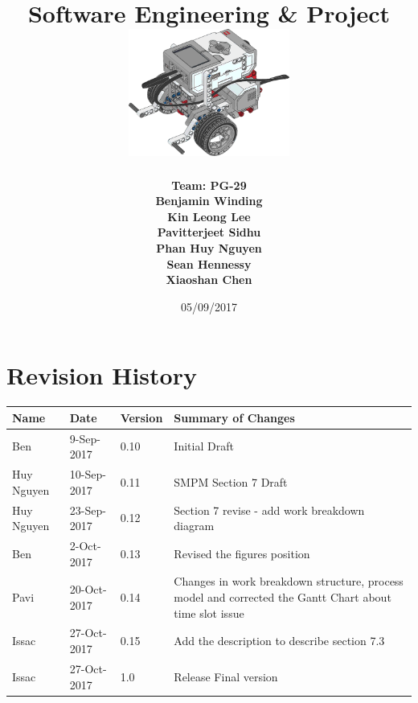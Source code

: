 \documentclass[10pt,a4paper,titlepage]{article}
\begin{document}
	
	\begin{titlepage}
		
		\title{
			\fontsize{50}{12}\\
			\vspace{20pt}
			\fontsize{20}{12}\\
			\vspace{10pt}
			\large{Software Engineering \& Project} \\
			\vspace{20pt}
			\includegraphics[width=200px]{title-page-ev3.png}					
		}
		\date{05/09/2017}
		\author{
			\bf{Team: PG-29} \\
			Benjamin Winding \\
			Kin Leong Lee \\
			Pavitterjeet Sidhu \\
			Phan Huy Nguyen \\
			Sean Hennessy \\
			Xiaoshan Chen \\
		}
		\maketitle
		
	\end{titlepage}
		 
	\tableofcontents	
	\listoffigures
	\listoftables
	
	
	\section*{Revision History}	
	\label{revtable}	
	\begin{tabular}{|p{2.1cm}|p{2.5cm}|p{2cm}|p{4.1cm}|}		
		\hline 
		\textbf {Name} & \textbf{Date} & \textbf {Version} &\textbf {Summary of Changes} \\ \hline
		Ben & 9-Sep-2017 & 0.10 & Initial Draft\\ 
		\hline Huy Nguyen & 10-Sep-2017 & 0.11 & SMPM Section 7 Draft\\ 
		\hline	Huy Nguyen & 23-Sep-2017 & 0.12 & Section 7 revise - add work breakdown diagram\\ 
	\hline	Ben & 2-Oct-2017 & 0.13 & Revised the figures position\\ 
	\hline
		Pavi & 20-Oct-2017 & 0.14 & Changes in work breakdown structure, process model and corrected the Gantt Chart about time slot issue \\ \hline
		Issac & 27-Oct-2017 & 0.15 & Add the description to describe section 7.3  \\ \hline
		Issac & 27-Oct-2017 & 1.0 & Release Final version \\ \hline
		
	\end{tabular}
\end{document}
